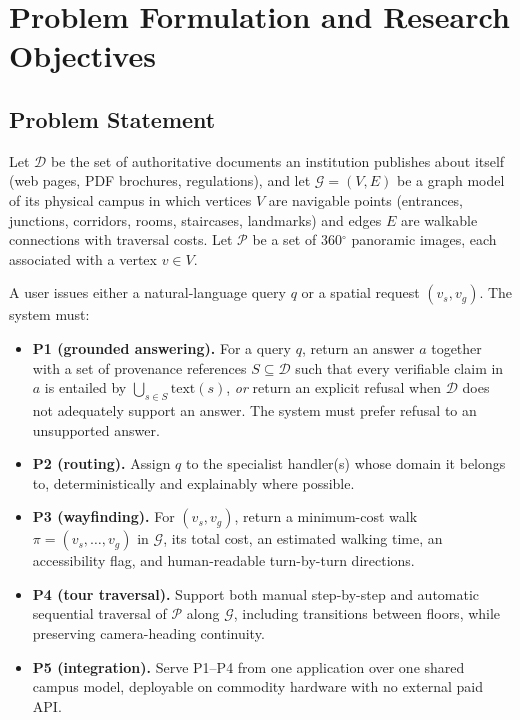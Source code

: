 \section{Problem Formulation and Research Objectives}
\label{sec:problem}

\subsection{Problem Statement}
Let $\mathcal{D}$ be the set of authoritative documents an institution
publishes about itself (web pages, PDF brochures, regulations), and let
$\mathcal{G}=(V,E)$ be a graph model of its physical campus in which
vertices $V$ are navigable points (entrances, junctions, corridors, rooms,
staircases, landmarks) and edges $E$ are walkable connections with
traversal costs. Let $\mathcal{P}$ be a set of 360$^{\circ}$ panoramic
images, each associated with a vertex $v\in V$.

A user issues either a natural-language query $q$ or a spatial request
$(v_s, v_g)$. The system must:

\begin{itemize}
\item \textbf{P1 (grounded answering).} For a query $q$, return an answer
$a$ together with a set of provenance references $S\subseteq\mathcal{D}$
such that every verifiable claim in $a$ is entailed by
$\bigcup_{s\in S}\mathrm{text}(s)$, \emph{or} return an explicit refusal
when $\mathcal{D}$ does not adequately support an answer. The system must
prefer refusal to an unsupported answer.
\item \textbf{P2 (routing).} Assign $q$ to the specialist handler(s) whose
domain it belongs to, deterministically and explainably where possible.
\item \textbf{P3 (wayfinding).} For $(v_s,v_g)$, return a minimum-cost walk
$\pi = (v_s,\dots,v_g)$ in $\mathcal{G}$, its total cost, an estimated
walking time, an accessibility flag, and human-readable turn-by-turn
directions.
\item \textbf{P4 (tour traversal).} Support both manual step-by-step and
automatic sequential traversal of $\mathcal{P}$ along $\mathcal{G}$,
including transitions between floors, while preserving camera-heading
continuity.
\item \textbf{P5 (integration).} Serve P1--P4 from one application over one
shared campus model, deployable on commodity hardware with no external
paid API.
\end{itemize}

